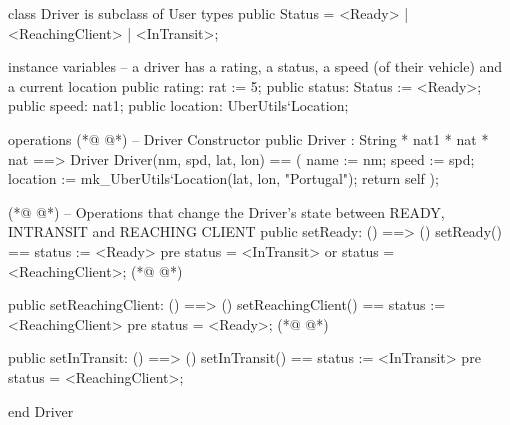 \begin{vdmpp}[breaklines=true]
class Driver is subclass of User
types
    public Status = <Ready> | <ReachingClient> | <InTransit>;

instance variables
    -- a driver has a rating, a status, a speed (of their vehicle) and a current location
    public rating: rat := 5;
    public status: Status := <Ready>;
    public speed: nat1;
    public location: UberUtils`Location;

operations
(*@
\label{Driver:13}
@*)
  -- Driver Constructor
    public Driver : String * nat1 * nat * nat ==> Driver
        Driver(nm, spd, lat, lon) == (
            name := nm;
            speed := spd;
            location := mk_UberUtils`Location(lat, lon, "Portugal");
            return self
        );
    
(*@
\label{setReady:22}
@*)
    -- Operations that change the Driver's state between READY, INTRANSIT and REACHING CLIENT
    public setReady: () ==> ()
        setReady() ==
            status := <Ready>
            pre status = <InTransit> or status = <ReachingClient>;
(*@
\label{setReachingClient:27}
@*)
        
    public setReachingClient: () ==> ()
        setReachingClient() ==
            status := <ReachingClient>
            pre status = <Ready>;
(*@
\label{setInTransit:32}
@*)
    
    public setInTransit: () ==> ()
        setInTransit() ==
            status := <InTransit>
            pre status = <ReachingClient>;

end Driver
\end{vdmpp}
